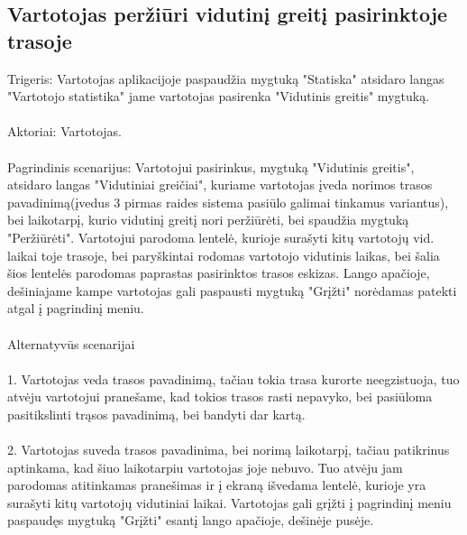 \documentclass[oneside]{VUMIFPSkursinis}
\begin{document}
\subsection{Vartotojas peržiūri vidutinį greitį pasirinktoje trasoje}
Trigeris: Vartotojas aplikacijoje paspaudžia mygtuką "Statiska" atsidaro langas "Vartotojo statistika" jame vartotojas pasirenka "Vidutinis greitis" mygtuką. \\ \\
Aktoriai: Vartotojas. \\ \\ 
Pagrindinis scenarijus: Vartotojui pasirinkus, mygtuką "Vidutinis greitis", atsidaro langas "Vidutiniai greičiai", kuriame vartotojas įveda norimos trasos pavadinimą(įvedus 3 pirmas raides sistema pasiūlo galimai tinkamus variantus), bei laikotarpį, kurio vidutinį greitį nori peržiūrėti, bei spaudžia mygtuką "Peržiūrėti". Vartotojui parodoma lentelė, kurioje surašyti kitų vartotojų vid. laikai toje trasoje, bei paryškintai rodomas vartotojo vidutinis laikas, bei šalia šios lentelės parodomas paprastas pasirinktos trasos eskizas. Lango apačioje, dešiniajame kampe vartotojas gali paspausti mygtuką "Grįžti" norėdamas patekti atgal į pagrindinį meniu. \\ \\
Alternatyvūs scenarijai \\ \\
1. Vartotojas veda trasos pavadinimą, tačiau tokia trasa kurorte neegzistuoja, tuo atvėju vartotojui pranešame, kad tokios trasos rasti nepavyko, bei pasiūloma pasitikslinti trąsos pavadinimą, bei bandyti dar kartą. \\ \\
2. Vartotojas suveda trasos pavadinima, bei norimą laikotarpį, tačiau patikrinus aptinkama, kad šiuo laikotarpiu vartotojas joje nebuvo. Tuo atvėju jam parodomas atitinkamas pranešimas ir į ekraną išvedama lentelė, kurioje yra surašyti kitų vartotojų vidutiniai laikai. Vartotojas gali grįžti į pagrindinį meniu paspaudęs mygtuką "Grįžti" esantį lango apačioje, dešinėje pusėje. \\ \\
\end{document}
